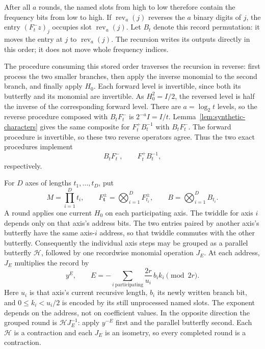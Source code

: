 After all $a$ rounds, the named slots from high to low therefore
contain the frequency bits from low to high.  If
$\operatorname{rev}_a(j)$ reverses the $a$ binary digits of $j$, the
entry $(F_t^-z)_j$ occupies slot $\operatorname{rev}_a(j)$.
Let $B_t$ denote this record permutation: it moves the entry at $j$
to $\operatorname{rev}_a(j)$.  The recursion writes its outputs
directly in this order; it does not move whole frequency indices.

The procedure consuming this stored order traverses the recursion in
reverse: first process the two smaller branches, then apply the inverse
monomial to the second branch, and finally apply $H_0$.  Each forward
level is invertible, since both its butterfly and its monomial are
invertible.  As $H_0^2=I/2$, the reversed level is half the inverse
of the corresponding forward level.  There are $a=\log_2t$ levels,
so the reverse procedure composed with $B_tF_t^-$ is
$2^{-a}I=I/t$.  Lemma~\ref{lem:synthetic-characters} gives the same
composite for $F_t^+B_t^{-1}$ with $B_tF_t^-$.  The forward procedure
is invertible, so these two reverse operators agree.  Thus the two
exact procedures implement
\begin{equation}
       B_tF_t^-,\qquad F_t^+B_t^{-1},
 \label{eq:stored-opposite}
\end{equation}
respectively.

For $D$ axes of lengths $t_1,\ldots,t_D$, put
\[
 M=\prod_{i=1}^D t_i,\qquad
 F_{\boldsymbol t}^\pm=\bigotimes_{i=1}^D F_{t_i}^\pm,
 \qquad B=\bigotimes_{i=1}^D B_{t_i}.
\]
A round applies one current $H_0$ on each participating axis.  The
twiddle for axis $i$ depends only on that axis's address bits.
The two entries paired by another axis's butterfly have the same
axis-$i$ address, so that twiddle commutes with the other butterfly.
Consequently the individual axis steps may be grouped as a parallel
butterfly $\mathcal H$, followed by one recordwise monomial operation
$J_E$.  At each address, $J_E$ multiplies the record by
\begin{equation}
       y^{E},\qquad
 E=-\sum_{i\ \mathrm{participating}}
       \frac{2r}{u_i}\,b_i k_i\pmod{2r}.
 \label{eq:combined-twiddle}
\end{equation}
Here $u_i$ is that axis's current recursive length, $b_i$ its newly
written branch bit, and $0\leq k_i<u_i/2$ is encoded by its still
unprocessed named slots.  The exponent depends on the address, not
on coefficient values.  In the opposite direction the grouped round
is $\mathcal HJ_E^{-1}$: apply $y^{-E}$ first and the parallel
butterfly second.  Each $\mathcal H$ is a contraction and each
$J_E$ is an isometry, so every completed round is a contraction.

